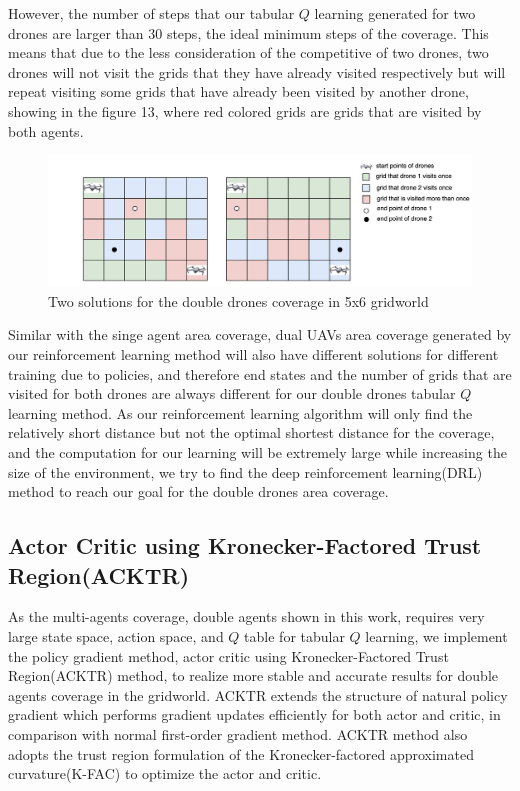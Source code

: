 \documentclass{article}
\begin{document}
However, the number of steps that our tabular $Q$ learning generated for two drones are larger than 30 steps, the ideal minimum steps of the coverage. This means that due to the less consideration of the competitive of two drones, two drones will not visit the grids that they have already visited respectively but will repeat visiting some grids that have already been visited by another drone, showing in the figure 13, where red colored grids are grids that are visited by both agents.

\begin{figure}[H]
    \centering
    \includegraphics[width=.85\linewidth]{17.png}
    \caption{Two solutions for the double drones coverage in 5x6 gridworld}
\end{figure}
Similar with the singe agent area coverage, dual UAVs area coverage generated by our reinforcement learning method will also have different solutions for different training due to policies, and therefore end states and the number of grids that are visited for both drones are always different for our double drones tabular $Q$ learning method. As our reinforcement learning algorithm will only find the relatively short distance but not the optimal shortest distance for the coverage, and the computation for our learning will be extremely large while increasing the size of the environment, we try to find the deep reinforcement learning(DRL) method to reach our goal for the double drones area coverage. 

\subsection{Actor Critic using Kronecker-Factored Trust Region(ACKTR)}

\hspace{\parindent}As the multi-agents coverage, double agents shown in this work, requires very large state space, action space, and $Q$ table for tabular $Q$ learning, we implement the policy gradient method, actor critic using Kronecker-Factored Trust Region(ACKTR) method, to realize more stable and accurate results for double agents coverage in the gridworld. ACKTR extends the structure of natural policy gradient which performs gradient updates efficiently for both actor and critic, in comparison with normal first-order gradient method. ACKTR method also adopts the trust region formulation of the Kronecker-factored approximated curvature(K-FAC) to optimize the actor and critic\cite{ACKTR}. 
\end{document}
